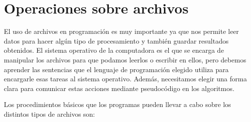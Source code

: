 \documentclass[
]{book}
\begin{document}
\hypertarget{operaciones-sobre-archivos}{%
\section{Operaciones sobre archivos}\label{operaciones-sobre-archivos}}

El uso de archivos en programación es muy importante ya que nos permite leer datos para hacer algún tipo de procesamiento y también guardar resultados obtenidos. El sistema operativo de la computadora es el que se encarga de manipular los archivos para que podamos leerlos o escribir en ellos, pero debemos aprender las sentencias que el lenguaje de programación elegido utiliza para encargarle esas tareas al sistema operativo. Además, necesitamos elegir una forma clara para comunicar estas acciones mediante pseudocódigo en los algoritmos.

Los procedimientos básicos que los programas pueden llevar a cabo sobre los distintos tipos de archivos son:
\end{document}
